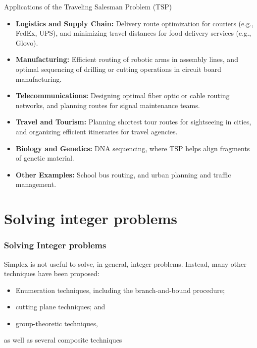 \documentclass[c]{beamer}
\begin{document}
\begin{frame}{Applications of the Traveling Salesman Problem (TSP)}
  \begin{itemize}
      \item \textbf{Logistics and Supply Chain:} Delivery route optimization for couriers (e.g., FedEx, UPS), and minimizing travel distances for food delivery services (e.g., Glovo).
      \item \textbf{Manufacturing:} Efficient routing of robotic arms in assembly lines, and optimal sequencing of drilling or cutting operations in circuit board manufacturing.
      \item \textbf{Telecommunications:} Designing optimal fiber optic or cable routing networks, and planning routes for signal maintenance teams.
      \item \textbf{Travel and Tourism:} Planning shortest tour routes for sightseeing in cities, and organizing efficient itineraries for travel agencies.
      \item \textbf{Biology and Genetics:} DNA sequencing, where TSP helps align fragments of genetic material.
      \item \textbf{Other Examples:} School bus routing, and urban planning and traffic management.
  \end{itemize}
\end{frame}

\section{Solving integer problems}

\begin{frame}
  \frametitle{Solving Integer problems}

  Simplex is not useful to solve, in general, integer problems. Instead, many other techniques have been proposed:
  \begin{itemize}
    \item Enumeration techniques, including the branch-and-bound procedure;
    \item cutting plane techniques; and 
    \item group-theoretic techniques,
  \end{itemize}

  as well as several composite techniques
  

\end{frame}
\end{document}
